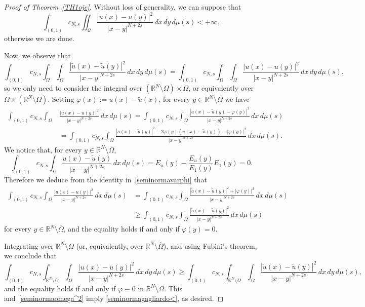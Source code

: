 \documentclass[12pt,a4paper,intlimits,sumlimits]{amsart}
\def \R {\mathbb{R}}
\def \Q {\mathcal Q}
\theoremstyle{definition}
\theoremstyle{plain}
\numberwithin{equation}{section}
\renewcommand{\geq}{\geqslant}
\begin{document}
\begin{proof}[Proof of Theorem~\ref{TH1ojc}]
Without loss of generality, we can suppose that
\[
\int_{(0, 1)}c_{N,s}\iint_\Q \frac{|u(x)-u(y)|^2}{|x-y|^{N+2s}}\,dx\,dy\,d\mu(s)<+\infty,
\]
otherwise we are done.

Now, we observe that 
\begin{equation}\label{seminormaomega^2}
\int_{(0, 1)}c_{N,s}\int_\Omega \int_\Omega
\frac{|\widetilde{u}(x)-\widetilde{u}(y)|^2}{|x-y|^{N+2s}}\,dx\,dy\,d\mu(s)
=\int_{(0, 1)}c_{N,s}\int_\Omega \int_\Omega
\frac{|u(x)-u(y)|^2}{|x-y|^{N+2s}}\,dx\,dy\,d\mu(s),
\end{equation}
so we only need to consider the integral over 
$(\R^N\setminus \Omega)\times \Omega$, or equivalently over 
$\Omega \times (\R^N\setminus \Omega)$.
Setting $\varphi(x):=u(x)-\widetilde{u}(x)$, for every 
$y\in \R^N\setminus \overline{\Omega}$ we have
\begin{equation}\label{seminormavarphi}
\begin{aligned}
\int_{(0, 1)}c_{N,s}\int_\Omega &
\frac{|u(x)-u(y)|^2}{|x-y|^{N+2s}}\,dx\,d\mu(s)
=\int_{(0, 1)}c_{N,s}\int_\Omega
\frac{|u(x)-\widetilde{u}(y)-\varphi(y)|^2}{|x-y|^{N+2s}}\,dx\,d\mu(s)\\
&=\int_{(0, 1)}c_{N,s}\int_\Omega
\frac{|u(x)-\widetilde{u}(y)|^2-2\varphi(y)(u(x)-\widetilde{u}(y))+|\varphi(y)|^2}{|x-y|^{N+2s}}\,dx\,d\mu(s).
\end{aligned}
\end{equation}
We notice that, for every $y\in \R^N\setminus \overline{\Omega}$,
\[
\int_{(0, 1)}c_{N,s}\int_\Omega
\frac{u(x)-\widetilde{u}(y)}{|x-y|^{N+2s}}\,dx\,d\mu(s)
=E_u(y)-\frac{E_u(y)}{E_1(y)}E_1(y)=0.
\]
Therefore we deduce from the identity in~\eqref{seminormavarphi} that
\[
\begin{aligned}
\int_{(0, 1)}c_{N,s}\int_\Omega 
\frac{|u(x)-u(y)|^2}{|x-y|^{N+2s}}\,dx\,d\mu(s)
&=\int_{(0, 1)}c_{N,s}\int_\Omega
\frac{|\widetilde{u}(x)-\widetilde{u}(y)|^2+|\varphi(y)|^2}{|x-y|^{N+2s}}\,dx\,d\mu(s) \\
&\geq \int_{(0, 1)}c_{N,s}\int_\Omega
\frac{|\widetilde{u}(x)-\widetilde{u}(y)|^2}{|x-y|^{N+2s}}\,dx\,d\mu(s)
\end{aligned}
\]
for every $y\in \R^N\setminus \overline{\Omega}$, and the 
equality holds if and only if $\varphi(y)=0$.

Integrating over $\R^N\setminus \Omega$ (or, equivalently, over
$\R^N\setminus \overline{\Omega}$), and using Fubini's theorem,
we conclude that
\[
\int_{(0, 1)}c_{N,s}\int_{\R^N\setminus \Omega}\int_\Omega 
\frac{|u(x)-u(y)|^2}{|x-y|^{N+2s}}\,dx\,dy\,d\mu(s)
\geq \int_{(0, 1)}c_{N,s}\int_{\R^N\setminus \Omega}\int_\Omega
\frac{|\widetilde{u}(x)-\widetilde{u}(y)|^2}{|x-y|^{N+2s}}\,dx\,dy\,d\mu(s),
\]
and the equality holds if and only if $\varphi\equiv 0$ in
$\R^N\setminus \Omega$. This and~\eqref{seminormaomega^2} imply
\eqref{seminormagagliardo<}, as desired.
\end{proof}
\end{document}

